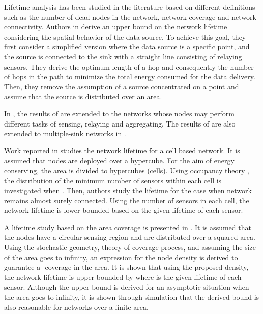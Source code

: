 \documentclass[conference]{IEEEtran}
\begin{document}
Lifetime analysis has been studied in the literature based on
different definitions such as the number of dead nodes in the
network, network coverage and network
connectivity\cite{Chandr_Upperbound_ICC,Chandr_Upperbound_Role_Infocom,
Azad_Multipe_Globecom,Santi_Lifetime_cellbased,
Hou_Alpha_lifetime,Rai_Lifetime_Modeling_DATE}. Authors in
\cite{Chandr_Upperbound_ICC} derive an upper bound on the network
lifetime considering the spatial behavior of the data source. To
achieve this goal, they first consider a simplified version where
the data source is a specific point, and the source is connected to
the sink with a straight line consisting of relaying sensors. They
derive the optimum length of a hop and consequently the number of
hops in the path to minimize the total energy consumed for the data
delivery. Then, they remove the assumption of a source concentrated
on a point and assume that the source is distributed over an area.

In \cite{Chandr_Upperbound_Role_Infocom}, the results of
\cite{Chandr_Upperbound_ICC} are extended to the networks whose
nodes may perform different tasks of sensing, relaying and
aggregating. The results of \cite{Chandr_Upperbound_ICC} are also
extended to multiple-sink networks in \cite{Azad_Multipe_Globecom}.

Work reported in \cite{Santi_Lifetime_cellbased} studies the network
lifetime for a cell based network. It is assumed that  nodes are
deployed over a hypercube. For the aim of energy conserving, the
area is divided to  hypercubes (cells). Using occupancy theory
\cite{Kolchin_Random_allocation}, the distribution of the minimum
number of sensors within each cell is investigated when
. Then, authors study the lifetime for the
case when network remains almost surely connected. Using the number
of sensors in each cell, the network lifetime is lower bounded based
on the given lifetime of each sensor.

A lifetime study based on the area coverage is presented in
\cite{Hou_Alpha_lifetime}. It is assumed that the nodes have a
circular sensing region and are distributed over a squared area.
Using the stochastic geometry, theory of coverage process, and
assuming the size of the area goes to infinity, an expression for
the node density is derived to guarantee a -coverage in the area.
It is shown that using the proposed density, the network lifetime is
upper bounded by  where  is the given lifetime of each
sensor. Although the upper bound is derived for an asymptotic
situation when the area goes to infinity, it is shown through
simulation that the derived bound is also reasonable for networks
over a finite area.
\end{document}
